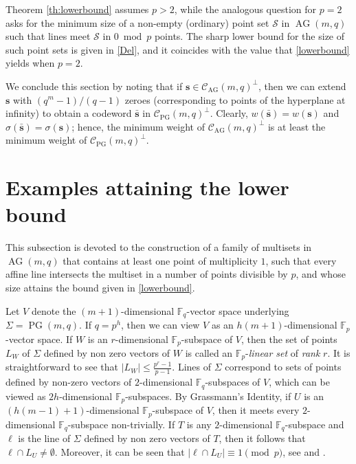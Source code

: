 \documentclass[12pt]{article}
\newcommand{\cC}{{\mathcal C}}
\newcommand{\cS}{{\mathcal S}}
\newcommand{\F}{{\mathbb F}}
\DeclareMathOperator{\PG}{{PG}}
\DeclareMathOperator{\AG}{{AG}}
\begin{document}
Theorem \ref{th:lowerbound} assumes $p>2$, while the analogous question for $p=2$ asks for the minimum size of a non-empty (ordinary) point set $\cS$ in $\AG(m,q)$ such that lines meet $\cS$ in $0 \bmod p$ points. The sharp lower bound for the size of such point sets is given in \eqref{Del}, and it coincides with the value that \eqref{lowerbound} yields when $p=2$. 



\medskip
\noindent We conclude this section by noting that if $\mathbf{s}\in \cC_{\mathrm{AG}}(m,q)^\perp$, then we can extend $\mathbf{s}$ with $(q^m-1)/(q-1)$ zeroes (corresponding to points of the hyperplane at infinity) to obtain a codeword $\bar{\mathbf{s}}$ in $\cC_{\mathrm{PG}}(m,q)^\perp$. Clearly, $w(\bar{\mathbf{s}})=w(\mathbf{s})$ and $\sigma(\bar{\mathbf{s}})=\sigma(\mathbf{s})$; hence, the minimum weight of $\cC_{\mathrm{AG}}(m,q)^\perp$ is at least the minimum weight of $\cC_{\mathrm{PG}}(m,q)^\perp$.


\section{Examples attaining the lower bound}\label{sec_examples}

This subsection is devoted to the construction of a family of multisets in $\AG(m,q)$ that contains at least one point of multiplicity $1$, such that every affine line intersects the multiset in a number of points divisible by $p$, and whose size attains the bound given in \eqref{lowerbound}.

\medskip

\noindent Let $V$ denote the $(m+1)$-dimensional $\F_q$-vector space underlying $\Sigma=\PG(m,q)$. If $q=p^h$, then we can view $V$ as an $h(m+1)$-dimensional $\F_p$-vector space. If $W$ is an $r$-dimensional $\F_p$-subspace of $V$, then the set of points $L_W$ of $\Sigma$ defined by non zero vectors of $W$ is called an $\F_p$-\textit{linear set} of \textit{rank} $r$. It is straightforward to see that  $\vert L_W \vert \leq \frac{p^r-1}{p-1}$. Lines of $\Sigma$ correspond to sets of points defined by non-zero vectors of $2$-dimensional $\F_q$-subspaces of $V$, which can be viewed as $2h$-dimensional $\F_p$-subspaces. 
By Grassmann's Identity, if $U$ is an $(h(m-1)+1)$-dimensional $\F_p$-subspace of $V$, then it meets every $2$-dimensional $\F_q$-subspace non-trivially. If $T$ is any $2$-dimensional $\F_q$-subspace and $\ell$ is the line of $\Sigma$ defined by non zero vectors of $T$, then it follows that $\ell \cap L_U\neq \emptyset$. Moreover, it can be seen that $|\ell \cap L_U |\equiv 1 \pmod p$, see \cite{Bonoli-Polverino} and \cite[Proposition 2.2]{linearset}.
\end{document}
